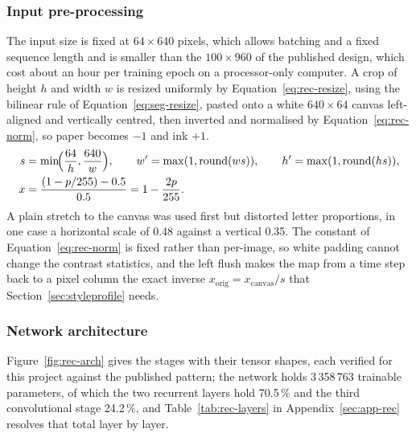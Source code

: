 \subsubsection{Input pre-processing}

The input size is fixed at $64\times640$ pixels, which allows batching and a fixed sequence length and is smaller than the $100\times960$ of the published design, which cost about an hour per training epoch on a processor-only computer.
A crop of height $h$ and width $w$ is resized uniformly by Equation~\ref{eq:rec-resize}, using the bilinear rule of Equation~\ref{eq:seg-resize}, pasted onto a white $640\times64$ canvas left-aligned and vertically centred, then inverted and normalised by Equation~\ref{eq:rec-norm}, so paper becomes $-1$ and ink $+1$.
\begin{align}
s&=\min\!\Bigl(\frac{64}{h},\frac{640}{w}\Bigr),\qquad w'=\max(1,\mathrm{round}(ws)),\qquad h'=\max(1,\mathrm{round}(hs)),\label{eq:rec-resize}\\
x&=\frac{(1-p/255)-0.5}{0.5}=1-\frac{2p}{255}.\label{eq:rec-norm}
\end{align}
A plain stretch to the canvas was used first but distorted letter proportions, in one case a horizontal scale of 0.48 against a vertical 0.35.
The constant of Equation~\ref{eq:rec-norm} is fixed rather than per-image, so white padding cannot change the contrast statistics, and the left flush makes the map from a time step back to a pixel column the exact inverse $x_{\mathrm{orig}}=x_{\mathrm{canvas}}/s$ that Section~\ref{sec:styleprofile} needs.

\subsubsection{Network architecture}

Figure~\ref{fig:rec-arch} gives the stages with their tensor shapes, each verified for this project against the published pattern; the network holds 3\,358\,763 trainable parameters, of which the two recurrent layers hold 70.5\,\% and the third convolutional stage 24.2\,\%, and Table~\ref{tab:rec-layers} in Appendix~\ref{sec:app-rec} resolves that total layer by layer.

